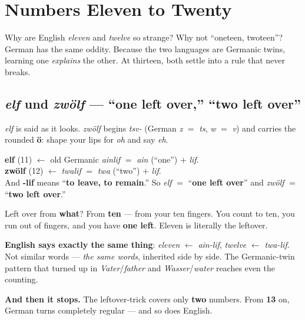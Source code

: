 \chapter{Numbers Eleven to Twenty}
\label{ch:numbers-11-20}

Why are English \emph{eleven} and \emph{twelve} so strange? Why not ``oneteen,
twoteen''? German has the same oddity. Because the two languages are Germanic
twins, learning one \emph{explains} the other. At thirteen, both settle into a
rule that never breaks.

\section{\emph{elf} und \emph{zw\"{o}lf} --- ``one left over,'' ``two left over''}
\label{lesson:elf-zwoelf}

\begin{sounds}
\emph{elf} is said as it looks. \emph{zw\"{o}lf} begins \emph{tsv-} (German
\emph{z} $=$ \emph{ts}, \emph{w} $=$ \emph{v}) and carries the rounded
\textbf{\"{o}}: shape your lips for \emph{oh} and say \emph{eh}.
\end{sounds}

\begin{morphologybox}
\textbf{elf} (11) $\leftarrow$ old Germanic \emph{ainlif} $=$ \emph{ain}
(``one'') $+$ \emph{lif}.\\[3pt]
\textbf{zw\"{o}lf} (12) $\leftarrow$ \emph{twalif} $=$ \emph{twa} (``two'')
$+$ \emph{lif}.\\[3pt]
And \textbf{-lif} means ``\textbf{to leave, to remain}.'' So \emph{elf} $=$
``\textbf{one left over}'' and \emph{zw\"{o}lf} $=$ ``\textbf{two left over}.''
\end{morphologybox}

Left over from \textbf{what}? From \textbf{ten} --- from your ten fingers. You
count to ten, you run out of fingers, and you have \textbf{one left}. Eleven is
literally the leftover.

\begin{cousinweb}
\textbf{English says exactly the same thing}: \emph{eleven} $\leftarrow$
\emph{ain-lif}, \emph{twelve} $\leftarrow$ \emph{twa-lif}. Not similar words
--- \emph{the same words}, inherited side by side. The Germanic-twin pattern
that turned up in \emph{Vater}/\emph{father} and \emph{Wasser}/\emph{water}
reaches even the counting.
\end{cousinweb}

\begin{grammarlens}
\textbf{And then it stops.} The leftover-trick covers only \textbf{two}
numbers. From \textbf{13} on, German turns completely regular --- and so does
English.
\end{grammarlens}

